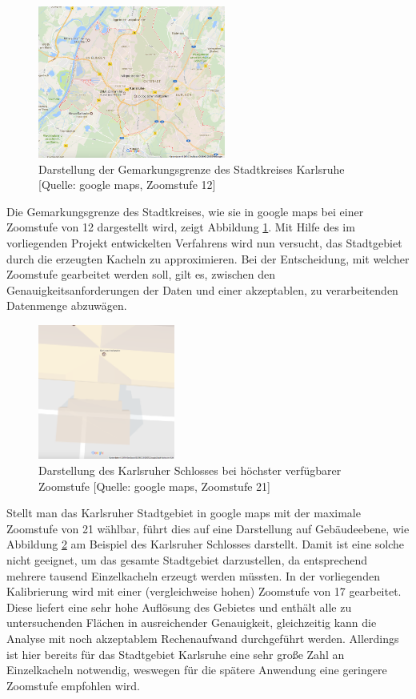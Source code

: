 \documentclass[12pt,a4paper]{scrartcl}
\begin{document}
%
\begin{figure}
  \centering
    \includegraphics[width=0.55\textwidth]{Stadtgebiet_KA_zoom12.PNG}
    \caption{Darstellung der Gemarkungsgrenze des Stadtkreises Karlsruhe [Quelle: google maps, Zoomstufe 12]}
    \label{fig:Stadtgebiet_KA}
\end{figure}
%
Die Gemarkungsgrenze des Stadtkreises, wie sie in google maps bei einer Zoomstufe von \num{12} dargestellt wird, zeigt Abbildung \ref{fig:Stadtgebiet_KA}. Mit Hilfe des im vorliegenden Projekt entwickelten Verfahrens wird nun versucht, das Stadtgebiet durch die erzeugten Kacheln zu approximieren. Bei der Entscheidung, mit welcher Zoomstufe gearbeitet werden soll, gilt es, zwischen den Genauigkeitsanforderungen  der Daten und einer akzeptablen, zu verarbeitenden Datenmenge abzuwägen. 
%
\begin{figure}
  \centering
    \includegraphics[width=0.4\textwidth]{KA_Schloss_zoom21.PNG}
    \caption{Darstellung des Karlsruher Schlosses bei höchster verfügbarer Zoomstufe [Quelle: google maps, Zoomstufe 21]}
    \label{fig:Schloss_KA}
\end{figure}
%
Stellt man das Karlsruher Stadtgebiet in google maps mit der maximale Zoomstufe von 21 wählbar, führt dies auf eine Darstellung auf Gebäudeebene, wie Abbildung \ref{fig:Schloss_KA} am Beispiel des Karlsruher Schlosses darstellt. Damit ist eine solche nicht geeignet, um das gesamte Stadtgebiet darzustellen, da entsprechend mehrere tausend Einzelkacheln erzeugt werden müssten. In der vorliegenden Kalibrierung wird mit einer (vergleichweise hohen) Zoomstufe von 17 gearbeitet. Diese liefert eine sehr hohe Auflösung des Gebietes und enthält alle zu untersuchenden Flächen in ausreichender Genauigkeit, gleichzeitig kann die Analyse mit noch akzeptablem Rechenaufwand durchgeführt werden. Allerdings ist hier bereits für das Stadtgebiet Karlsruhe eine sehr große Zahl an Einzelkacheln notwendig, weswegen für die spätere Anwendung eine geringere Zoomstufe empfohlen wird.\\
\end{document}
